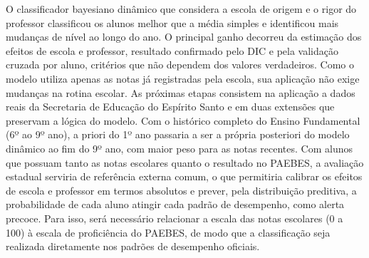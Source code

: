 \documentclass[12pt,a4paper]{article}
\begin{document}
O classificador bayesiano dinâmico que considera a escola de origem e o rigor do professor
classificou os alunos melhor que a média simples e identificou mais mudanças de nível ao longo
do ano. O principal ganho decorreu da estimação dos efeitos de escola e professor, resultado
confirmado pelo DIC e pela validação cruzada por aluno, critérios que não dependem dos valores
verdadeiros. Como o modelo utiliza apenas as notas já registradas pela escola, sua aplicação
não exige mudanças na rotina escolar. As próximas etapas consistem na aplicação a dados reais
da Secretaria de Educação do Espírito Santo e em duas extensões que preservam a lógica do
modelo. Com o histórico completo do Ensino Fundamental (6º ao 9º ano), a priori do 1º ano
passaria a ser a própria posteriori do modelo dinâmico ao fim do 9º ano, com maior peso para as
notas recentes. Com alunos que possuam tanto as notas escolares quanto o resultado no PAEBES, a
avaliação estadual serviria de referência externa comum, o que permitiria calibrar os efeitos
de escola e professor em termos absolutos e prever, pela distribuição preditiva, a
probabilidade de cada aluno atingir cada padrão de desempenho, como alerta precoce. Para isso,
será necessário relacionar a escala das notas escolares (0 a 100) à escala de proficiência do
PAEBES, de modo que a classificação seja realizada diretamente nos padrões de desempenho
oficiais.
\end{document}
